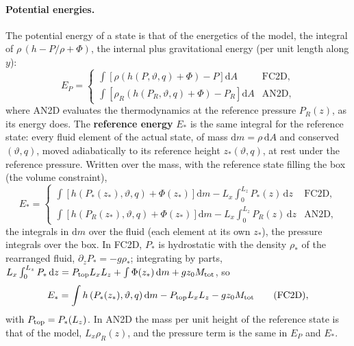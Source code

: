 \documentclass[11pt,a4paper]{article}
\newcommand{\vt}{\vartheta}
\newcommand{\Mtot}{M_{\rm tot}}
\newcommand{\Ptop}{P_{\rm top}}
\newcommand{\zs}{z_{*}}
\begin{document}
\paragraph{Potential energies.} The potential energy of a state is that of the energetics of the model, the integral of
$\rho\,(h-P/\rho+\Phi)$, the internal plus gravitational energy (per unit length along $y$):
\begin{equation}
  E_P=\begin{cases}
    \displaystyle\int\left[\rho\left(h(P,\vt,q)+\Phi\right)-P\right]\mathrm{d}A & \text{FC2D},\\[8pt]
    \displaystyle\int\left[\rho_R\left(h(P_R,\vt,q)+\Phi\right)-P_R\right]\mathrm{d}A & \text{AN2D},
  \end{cases}
  \label{eq:EP}
\end{equation}
where AN2D evaluates the thermodynamics at the reference pressure $P_R(z)$, as its energy does. The \textbf{reference
energy} $E_*$ is the same integral for the reference state: every fluid element of the actual state, of mass
$\mathrm{d}m=\rho\,\mathrm{d}A$ and conserved $(\vt,q)$, moved adiabatically to its reference height $\zs(\vt,q)$, at rest
under the reference pressure. Written over the mass, with the reference state filling the box (the volume constraint),
\begin{equation}
  E_*=\begin{cases}
    \displaystyle\int\left[h\left(P_*(\zs),\vt,q\right)+\Phi(\zs)\right]\mathrm{d}m-L_x\int_0^{L_z}P_*(z)\,\mathrm{d}z & \text{FC2D},\\[10pt]
    \displaystyle\int\left[h\left(P_R(\zs),\vt,q\right)+\Phi(\zs)\right]\mathrm{d}m-L_x\int_0^{L_z}P_R(z)\,\mathrm{d}z & \text{AN2D},
  \end{cases}
  \label{eq:Estar}
\end{equation}
the integrals in $\mathrm{d}m$ over the fluid (each element at its own $\zs$), the pressure integrals over the box. In FC2D,
$P_*$ is hydrostatic with the density $\rho_*$ of the rearranged fluid, $\partial_zP_*=-g\rho_*$; integrating by parts,
$L_x\int_0^{L_z}P_*\,\mathrm{d}z=\Ptop L_xL_z+\int\Phi(\zs)\,\mathrm{d}m+gz_0\Mtot$, so
\begin{equation}
  E_*=\int h\left(P_*(\zs),\vt,q\right)\mathrm{d}m-\Ptop L_xL_z-gz_0\Mtot\qquad\text{(FC2D)},
\end{equation}
with $\Ptop=P_*(L_z)$. In AN2D the mass per unit height of the reference state is that of the model, $L_x\rho_R(z)$, and the
pressure term is the same in $E_P$ and $E_*$.
\end{document}
